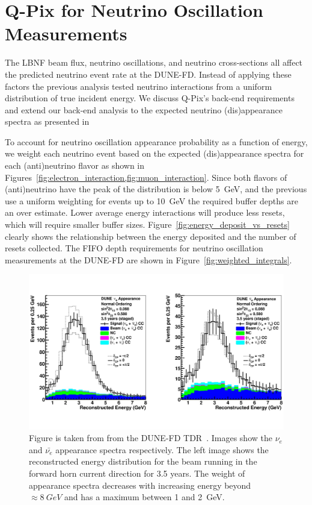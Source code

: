 \section{Q-Pix for Neutrino Oscillation Measurements}

The LBNF beam flux, neutrino oscillations, and neutrino cross-sections all affect the predicted neutrino event rate at the DUNE-FD.
Instead of applying these factors the previous analysis tested neutrino interactions from a uniform distribution of true incident energy.
We discuss Q-Pix's back-end requirements and extend our back-end analysis to the expected neutrino (dis)appearance spectra as presented in~\citep{DUNE_FD_TDRv2_2020}

To account for neutrino oscillation appearance probability as a function of energy, we weight each neutrino event based on the expected (dis)appearance spectra for each (anti)neutrino flavor as shown in Figures~\cref{fig:electron_interaction,fig:muon_interaction}.
Since both flavors of (anti)neutrino have the peak of the distribution is below 5~\unit{GeV}, and the previous use a uniform weighting for events up to 10~\unit{GeV} the required buffer depths are an over estimate.
Lower average energy interactions will produce less resets, which will require smaller buffer sizes.
Figure~\ref{fig:energy_deposit_vs_resets} clearly shows the relationship between the energy deposited and the number of resets collected.
The FIFO depth requirements for neutrino oscillation measurements at the DUNE-FD are shown in Figure~\ref{fig:weighted_integrals}.

\begin{figure}[]
\centering
\includegraphics[width=\textwidth]{images/tdr_electron_reconstruction_tdrv2.pdf}
\caption{Figure is taken from from the DUNE-FD TDR~\citep{DUNE_FD_TDRv2_2020}.
Images show the $\nu_{e}$ and $\bar{\nu_{e}}$ appearance spectra respectively.
The left image shows the reconstructed energy distribution for the beam running in the forward horn current direction for 3.5 years.
The weight of appearance spectra decreases with increasing energy beyond $\approx 8~\unit{GeV}$ and has a maximum between 1 and 2~\unit{GeV}.
}
\end{figure}~\label{fig:electron_interaction}

